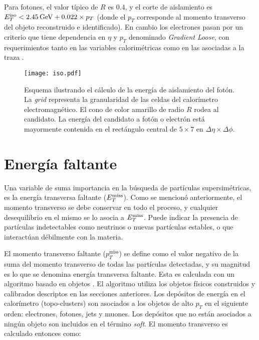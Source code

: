 Para fotones, el valor típico de $R$ es $0.4$, y el corte de aislamiento es $E_{T}^{\text{iso}}<2.45 \, \mathrm{GeV} + 0.022 \times p_{T}$ (donde el $p_{T}$ corresponde al momento transverso del objeto reconstruido e identificado). En cambio los electrones pasan por un criterio que tiene dependencia en $\eta$ y $p_{T}$ denominado \textit{Gradient Loose}, con requerimientos tanto en las variables calorimétricas como en las asociadas a la traza \cite{ATL-PHYS-PUB-2015-037_extra}.



\begin{figure}
\centering
\texttt{[image: iso.pdf]}
\caption{Esquema ilustrando el cálculo de la energía de aislamiento del fotón. La \textit{grid} representa la granularidad de las celdas del calorímetro electromagnético. El cono de color amarillo de radio $R$ rodea al candidato. La energía del candidato a fotón o electrón está mayormente contenida en el rectángulo central de $5 \times 7$ en $\Delta\eta \times \Delta\phi$.}
\label{isolation}
\end{figure}

\section{Energía faltante}

Una variable de suma importancia en la búsqueda de partículas supersimétricas, es la energía transversa faltante ($E_{T}^{\text{miss}}$). Como se mencionó anteriormente, el momento transverso se debe conservar en todo el proceso, y cualquier desequilibrio en el mismo se lo asocia a $E_{T}^{\text{miss}}$. Puede indicar la presencia de partículas indetectables como neutrinos o nuevas partículas estables, o que interactúan débilmente con la materia.

El momento transverso faltante ($p_{T}^{\text{miss}}$) se define como el valor negativo de la suma del momento transverso de todas las partículas detectadas, y su magnitud es lo que se denomina energía transversa faltante. Esta es calculada con un algoritmo basado en objetos \cite{Khoo:2012749}. El algoritmo utiliza los objetos físicos construidos y calibrados descriptos en las secciones anteriores. Los depósitos de energía en el calorímetro (topo-clusters) son asociados a los objetos de alto $p_{T}$ en el siguiente orden: electrones, fotones, jets y muones. Los depósitos que no están asociados a ningún objeto son incluidos en el término \textit{soft}. El momento transverso es calculado entonces como:

